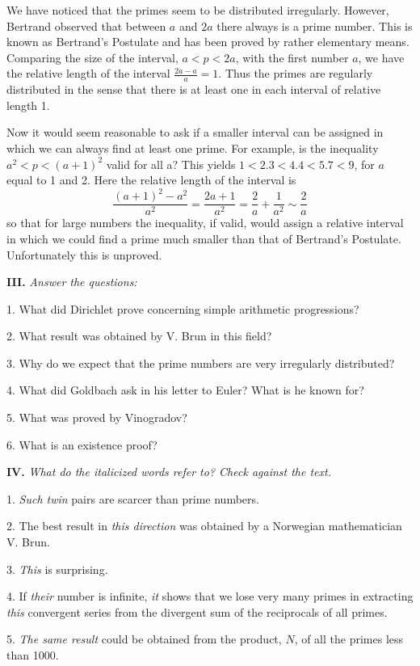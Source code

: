 \documentclass[a4paper]{article}
\newcommand{\ETask}[2]{\medskip\par\textbf{#1.} \textit{#2}\par}
\begin{document}
We have noticed that the primes seem to be distributed irregularly. However, Bertrand observed that between $a$ and $2a$
there always is a prime number. This is known as Bertrand's Postulate and has been proved by rather elementary means. Comparing
the size of the interval, $a < p < 2a$, with the first number $a$, we have the relative length of the interval
$\frac{2a - a}{a} = 1$. Thus the primes are regularly distributed in the sense that there is at least one in each interval of
relative length 1.

Now it would seem reasonable to ask if a smaller interval can be assigned in which we can always find at least one prime.
For example, is the inequality $a^2<p<(a+1)^2$ valid for all a? This yields $1 < 2.3 < 4.4 < 5.7 < 9$, for $a$ equal to 1 and 2.
Here the relative length of the interval is
$$\frac{(a+1)^2-a^2}{a^2}=\frac{2a+1}{a^2}=\frac{2}{a}+\frac{1}{a^2}\sim \frac{2}{a}$$
so that for large numbers the inequality, if valid, would assign a relative interval in which we could find a prime much
smaller than that of Bertrand's Postulate. Unfortunately this is unproved.

\ETask{III}{Answer the questions:}

1. What did Dirichlet prove concerning simple arithmetic progressions?

2. What result was obtained by V. Brun in this field?

3. Why do we expect that the prime numbers are very irregularly distributed?

4. What did Goldbach ask in his letter to Euler? What is he known for?

5. What was proved by Vinogradov?

6. What is an existence proof?

\ETask{IV}{What do the italicized words refer to? Check against the text.}

1. \textit{Such twin} pairs are scarcer than prime numbers.

2. The best result in \textit{this direction} was obtained by a Norwegian mathematician V. Brun.

3. \textit{This} is surprising.

4. If \textit{their} number is infinite, \textit{it} shows that we lose very many primes in extracting \textit{this} convergent series
from the divergent sum of the reciprocals of all primes.

5. \textit{The same result} could be obtained from the product, $N$, of all the primes less than 1000.
\end{document}
